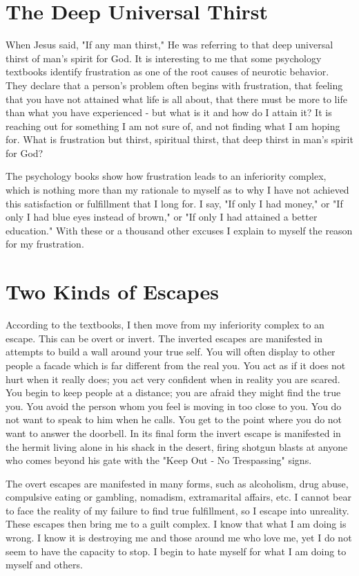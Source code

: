 \section*{The Deep Universal Thirst}

When Jesus said, "If any man thirst," He was referring to that deep universal thirst of man's spirit for God. It is interesting to me that some psychology textbooks identify frustration as one of the root causes of neurotic behavior. They declare that a person's problem often begins with frustration, that feeling that you have not attained what life is all about, that there must be more to life than what you have experienced - but what is it and how do I attain it? It is reaching out for something I am not sure of, and not finding what I am hoping for. What is frustration but thirst, spiritual thirst, that deep thirst in man's spirit for God? 

The psychology books show how frustration leads to an inferiority complex, which is nothing more than my rationale to myself as to why I have not achieved this satisfaction or fulfillment that I long for. I say, "If only I had money," or "If only I had blue eyes instead of brown," or "If only I had attained a better education." With these or a thousand other excuses I explain to myself the reason for my frustration. 

\section*{Two Kinds of Escapes}

According to the textbooks, I then move from my inferiority complex to an escape. This can be overt or invert. The inverted escapes are manifested in attempts to build a wall around your true self. You will often display to other people a facade which is far different from the real you. You act as if it does not hurt when it really does; you act very confident when in reality you are scared. You begin to keep people at a distance; you are afraid they might find the true you. You avoid the person whom you feel is moving in too close to you. You do not want to speak to him when he calls. You get to the point where you do not want to answer the doorbell. In its final form the invert escape is manifested in the hermit living alone in his shack in the desert, firing shotgun blasts at anyone who comes beyond his gate with the "Keep Out - No Trespassing" signs. 

The overt escapes are manifested in many forms, such as alcoholism, drug abuse, compulsive eating or gambling, nomadism, extramarital affairs, etc. I cannot bear to face the reality of my failure to find true fulfillment, so I escape into unreality. These escapes then bring me to a guilt complex. I know that what I am doing is wrong. I know it is destroying me and those around me who love me, yet I do not seem to have the capacity to stop. I begin to hate myself for what I am doing to myself and others. 

